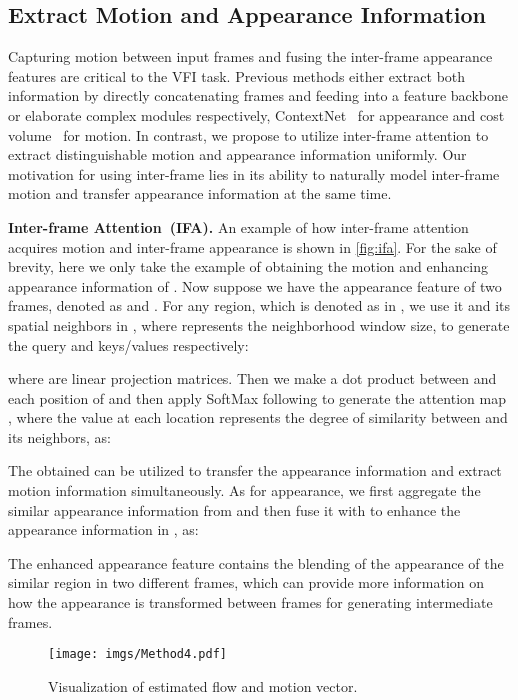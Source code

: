 \documentclass[10pt,twocolumn,letterpaper]{article}
\begin{document}
	\subsection{Extract Motion and Appearance Information}
        \label{sec:MAFormer}
        Capturing motion between input frames and fusing the inter-frame appearance features are critical to the VFI task. Previous methods either extract both information by directly concatenating frames and feeding into a feature backbone or elaborate complex modules respectively, \eg ContextNet~\cite{niklaus2018context,huang2020rife} for appearance and cost volume~\cite{park2020bmbc,park2021asymmetric} for motion. In contrast, we propose to utilize inter-frame attention to extract distinguishable motion and appearance information uniformly. Our motivation for using inter-frame lies in its ability to naturally model inter-frame motion and transfer appearance information at the same time.
        
        \noindent
        \textbf{Inter-frame Attention~(IFA).} An example of how inter-frame attention acquires motion and inter-frame appearance is shown in \cref{fig:ifa}. For the sake of brevity, here we only take the example of obtaining the motion and enhancing appearance information of . Now suppose we have the appearance feature of two frames, denoted as  and . For any region, which is denoted as  in , we use it and its spatial neighbors  in , where  represents the neighborhood window size, to generate the query and keys/values respectively: 
        
        where  are linear projection matrices. Then we make a dot product between  and each position of  and then apply SoftMax following \cite{vaswani2017attention} to generate the attention map , where the value at each location represents the degree of similarity between  and its neighbors, as:
        

        The obtained  can be utilized to transfer the appearance information and extract motion information simultaneously. As for appearance, we first aggregate the similar appearance information from  and then fuse it with  to enhance the appearance information in , as:
        
        
        The enhanced appearance feature  contains the blending of the appearance of the similar region in two different frames, which can provide more information on how the appearance is transformed between frames for generating intermediate frames.
        \begin{figure}[t]
		\begin{center}
\texttt{[image: imgs/Method4.pdf]}
		\end{center}
            \vspace{-0.2in}
		\caption{Visualization of estimated flow and motion vector.}
		\label{fig:mv}
		\vspace{-0.25in}
    \end{figure}
    
\end{document}
